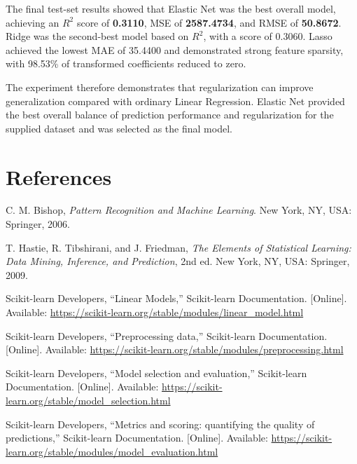 \documentclass[12pt,a4paper]{article}
\begin{document}
The final test-set results showed that Elastic Net was the best overall model, achieving an $R^2$ score of \textbf{0.3110}, MSE of \textbf{2587.4734}, and RMSE of \textbf{50.8672}. Ridge was the second-best model based on $R^2$, with a score of 0.3060. Lasso achieved the lowest MAE of 35.4400 and demonstrated strong feature sparsity, with 98.53\% of transformed coefficients reduced to zero.

The experiment therefore demonstrates that regularization can improve generalization compared with ordinary Linear Regression. Elastic Net provided the best overall balance of prediction performance and regularization for the supplied dataset and was selected as the final model.

\section{References}

\begin{enumerate}[label={[}\arabic*{]}]
    \item C. M. Bishop, \textit{Pattern Recognition and Machine Learning}. New York, NY, USA: Springer, 2006.

    \item T. Hastie, R. Tibshirani, and J. Friedman, \textit{The Elements of Statistical Learning: Data Mining, Inference, and Prediction}, 2nd ed. New York, NY, USA: Springer, 2009.

    \item Scikit-learn Developers, ``Linear Models,'' Scikit-learn Documentation. [Online]. Available: \url{https://scikit-learn.org/stable/modules/linear_model.html}

    \item Scikit-learn Developers, ``Preprocessing data,'' Scikit-learn Documentation. [Online]. Available: \url{https://scikit-learn.org/stable/modules/preprocessing.html}

    \item Scikit-learn Developers, ``Model selection and evaluation,'' Scikit-learn Documentation. [Online]. Available: \url{https://scikit-learn.org/stable/model_selection.html}

    \item Scikit-learn Developers, ``Metrics and scoring: quantifying the quality of predictions,'' Scikit-learn Documentation. [Online]. Available: \url{https://scikit-learn.org/stable/modules/model_evaluation.html}
\end{enumerate}
\end{document}
